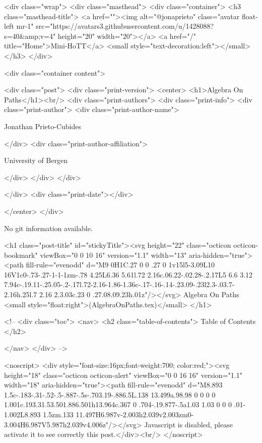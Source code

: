     <div class="wrap">
      <div class="masthead">
        <div class="container">
          <h3 class="masthead-title">
            <a href=""><img alt="@jonaprieto" class="avatar float-left mr-1" src="https://avatars3.githubusercontent.com/u/1428088?s=40&amp;v=4" height="20" width="20"></a>
            <a href="/" title="Home">Mini-HoTT</a>
            <small style="text-decoration:left"></small>
          </h3>
        </div>
      
      <div class="container content">
        







<div class="post">
  <div class="print-version">
    <center>
      <h1>Algebra On Paths</h1><br/>
        <div class="print-authors">
          <div class="print-info">
            <div class="print-author">
              <div class="print-author-name">
                
                  Jonathan Prieto-Cubides
                
              </div>
              <div class="print-author-affiliation">
                
                  University of Bergen
                
                </div>
            </div>
          </div>
          
          
        </div>
        <div class="print-date"></div>
        
        
    </center>
  </div>

  
  No git information available.
  

  <h1 class="post-title" id="stickyTitle"><svg height="22" class="octicon octicon-bookmark" viewBox="0 0 10 16" version="1.1" width="13" aria-hidden="true"><path fill-rule="evenodd" d="M9 0H1C.27 0 0 .27 0 1v15l5-3.09L10 16V1c0-.73-.27-1-1-1zm-.78 4.25L6.36 5.61l.72 2.16c.06.22-.02.28-.2.17L5 6.6 3.12 7.94c-.19.11-.25.05-.2-.17l.72-2.16-1.86-1.36c-.17-.16-.14-.23.09-.23l2.3-.03.7-2.16h.25l.7 2.16 2.3.03c.23 0 .27.08.09.23h.01z"/></svg> Algebra On Paths <small style="float:right">(AlgebraOnPaths.tex)</small>
  </h1>

  <!-- 
  <div class="toc">
    <nav>
    <h2 class="table-of-contents"> Table of Contents </h2>
      

    </nav>
  </div>
   -->

  <noscript>
  <div style="font-size:16px;font-weight:700; color:red;"><svg height="18" class="octicon octicon-alert" viewBox="0 0 16 16" version="1.1" width="18" aria-hidden="true"><path fill-rule="evenodd" d="M8.893 1.5c-.183-.31-.52-.5-.887-.5s-.703.19-.886.5L.138 13.499a.98.98 0 0 0 0 1.001c.193.31.53.501.886.501h13.964c.367 0 .704-.19.877-.5a1.03 1.03 0 0 0 .01-1.002L8.893 1.5zm.133 11.497H6.987v-2.003h2.039v2.003zm0-3.004H6.987V5.987h2.039v4.006z"/></svg> Javascript is disabled, please activate it to see correctly this post.</div><br/>
  </noscript>

